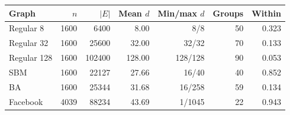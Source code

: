 \begin{tabular}{lrrrrrr}
\toprule
Graph & $n$ & $|E|$ & Mean $d$ & Min/max $d$ & Groups & Within \\
\midrule
Regular 8 & 1600 & 6400 & 8.00 & 8/8 & 50 & 0.323 \\
Regular 32 & 1600 & 25600 & 32.00 & 32/32 & 70 & 0.133 \\
Regular 128 & 1600 & 102400 & 128.00 & 128/128 & 90 & 0.053 \\
SBM & 1600 & 22127 & 27.66 & 16/40 & 40 & 0.852 \\
BA & 1600 & 25344 & 31.68 & 16/258 & 59 & 0.134 \\
Facebook & 4039 & 88234 & 43.69 & 1/1045 & 22 & 0.943 \\
\bottomrule
\end{tabular}